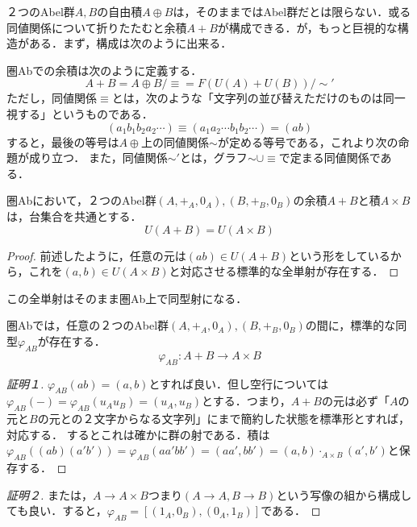 \documentclass[uplatex, dvipdfmx]{jsarticle}
\begin{document}
\begin{example}
    ２つのAbel群$A,B$の自由積$A\oplus B$は，そのままではAbel群だとは限らない．或る同値関係について折りたたむと余積$A+B$が構成できる．が，もっと巨視的な構造がある．まず，構成は次のように出来る．
    \begin{definition*}[Abでの余積]
        圏Abでの余積は次のように定義する．
        \[ A+B=A\oplus B/\equiv =F(U(A)+U(B))/\sim' \]
        ただし，同値関係$\equiv$とは，次のような「文字列の並び替えただけのものは同一視する」というものである．
        \[ (a_1b_1b_2a_2\cdots)\equiv (a_1a_2\cdots b_1b_2\cdots) = (ab) \]
        すると，最後の等号は$A\oplus$上の同値関係$\sim$が定める等号である，これより次の命題が成り立つ．
        また，同値関係$\sim'$とは，グラフ$\sim\cup\equiv$で定まる同値関係である．
    \end{definition*}
    \begin{proposition*}
        圏Abにおいて，２つのAbel群$(A,+_A,0_A),(B,+_B,0_B)$の余積$A+B$と積$A\times B$は，台集合を共通とする．
        \[ U(A+B)=U(A\times B) \]
    \end{proposition*}
    \begin{proof}
        前述したように，任意の元は$(ab)\in U(A+B)$という形をしているから，これを$(a,b)\in U(A\times B)$と対応させる標準的な全単射が存在する．
    \end{proof}
    この全単射はそのまま圏Ab上で同型射になる．
    \begin{proposition}
        圏Abでは，任意の２つのAbel群$(A,+_A,0_A),(B,+_B,0_B)$の間に，標準的な同型$\varphi_{AB}$が存在する．
        \[ \varphi_{AB}:A+B\to A\times B \]
    \end{proposition}
    \begin{proof}[証明１]
        $\varphi_{AB}(ab)=(a,b)$とすれば良い．但し空行については$\varphi_{AB}(-)=\varphi_{AB}(u_Au_B)=(u_A,u_B)$とする．つまり，$A+B$の元は必ず「$A$の元と$B$の元との２文字からなる文字列」にまで簡約した状態を標準形とすれば，対応する．
        するとこれは確かに群の射である．積は$\varphi_{AB}((ab)(a'b'))=\varphi_{AB}(aa'bb')=(aa',bb')=(a,b)\cdot_{A\times B}(a',b')$と保存する．
    \end{proof}
    \begin{proof}[証明２]
        または，$A\to A\times B$つまり$(A\to A,B\to B)$という写像の組から構成しても良い．すると，$\varphi_{AB}=[(1_A,0_B),(0_A,1_B)]$である．
    \end{proof}
    \begin{remark*}

\end{remark*}
\end{example}
\end{document}

